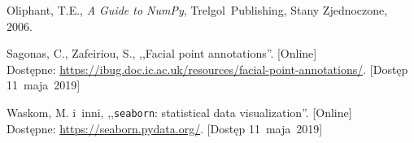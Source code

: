 \documentclass[11pt,a4paper]{article}
\begin{document}
\begin{thebibliography}{9}
        Oliphant, T.E.,
        \emph{A Guide to NumPy},
        Trelgol~Publishing,
        Stany Zjednoczone,
        2006.

        Sagonas, C.,
        Zafeiriou, S.,
        ,,Facial point annotations''.
        [Online]
        \\
        Dostępne: \url{https://ibug.doc.ic.ac.uk/resources/facial-point-annotations/}.
        [Dostęp 11~maja~2019]

        Waskom, M. i~inni,
        ,,\texttt{seaborn}: statistical data visualization''.
        [Online]
        \\
        Dostępne: \url{https://seaborn.pydata.org/}.
        [Dostęp 11~maja~2019]

\end{thebibliography}
\end{document}
